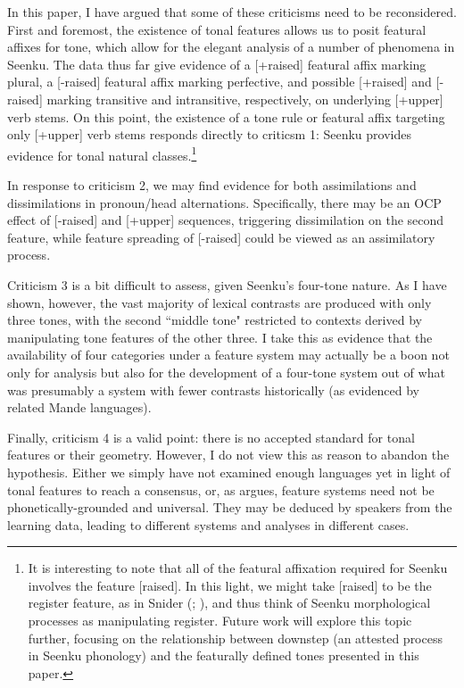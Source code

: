 \documentclass[output=paper]{langsci/langscibook}
\begin{document}
In this paper, I have argued that some of these criticisms need to be reconsidered. First and foremost, the existence of tonal features allows us to posit featural affixes for tone, which allow for the elegant analysis of a number of phenomena in Seenku. The data thus far give evidence of a {[+raised]} featural affix marking plural, a {[-raised]} featural affix marking perfective, and possible [+raised] and [-raised] marking transitive and intransitive, respectively, on underlying [+upper] verb stems. On this point, the existence of a tone rule or featural affix targeting only [+upper] verb stems responds directly to criticsm 1: Seenku provides evidence for tonal natural classes.\footnote{It is interesting to note that all of the featural affixation required for Seenku involves the feature [raised]. In this light, we might take [raised] to be the register feature, as in Snider (\citeyear{Snider90}; \citeyear{Snider98}), and thus think of Seenku morphological processes as manipulating register. Future work will explore this topic further, focusing on the relationship between downstep (an attested process in Seenku phonology) and the featurally defined tones presented in this paper.}

In response to criticism 2, we may find evidence for both assimilations and dissimilations in pronoun/head alternations. Specifically, there may be an OCP effect of [-raised] and [+upper] sequences, triggering dissimilation on the second feature, while feature spreading of [-raised] could be viewed as an assimilatory process.

Criticism 3 is a bit difficult to assess, given Seenku's four-tone nature. As I have shown, however, the vast majority of lexical contrasts are produced with only three tones, with the second ``middle tone" restricted to contexts derived by manipulating tone features of the other three. I take this as evidence that the availability of four categories under a feature system may actually be a boon not only for analysis but also for the development of a four-tone system out of what was presumably a system with fewer contrasts historically (as evidenced by related Mande languages).

Finally, criticism 4 is a valid point: there is no accepted standard for tonal features or their geometry. However, I do not view this as reason to abandon the hypothesis. Either we simply have not examined enough languages yet in light of tonal features to reach a consensus, or, as \citet{Odden10} argues, feature systems need not be phonetically-grounded and universal. They may be deduced by speakers from the learning data, leading to different systems and analyses in different cases. 
\end{document}
